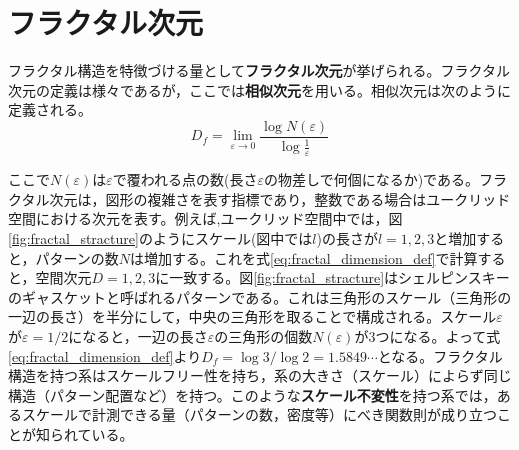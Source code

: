 \documentclass[autodetect-engine,dvi=dvipdfmx,a4paper,ja=standard,oneside,openany,11pt,draft]{bxjsbook}
\begin{document}
\section{フラクタル次元}
\label{sec:fractal_dimension}
フラクタル構造を特徴づける量として\textbf{フラクタル次元}が挙げられる。フラクタル次元の定義は様々であるが，ここでは\textbf{相似次元}を用いる。相似次元は次のように定義される。
\begin{equation}
  D_f=\lim_{\varepsilon \to 0}\frac{\log N(\varepsilon)}{\log \frac{1}{\varepsilon}}
  \label{eq:fractal_dimension_def}
\end{equation}

ここで$N(\varepsilon)$は$\varepsilon$で覆われる点の数(長さ$\varepsilon$の物差しで何個になるか)である。フラクタル次元は，図形の複雑さを表す指標であり，整数である場合はユークリッド空間における次元を表す。例えば,ユークリッド空間中では，図\ref{fig:fractal_stracture}のようにスケール(図中では$l$)の長さが$l=1,2,3$と増加すると，パターンの数$N$は増加する。これを式\ref{eq:fractal_dimension_def}で計算すると，空間次元$D=1,2,3$に一致する。図\ref{fig:fractal_stracture}はシェルピンスキーのギャスケットと呼ばれるパターンである。これは三角形のスケール（三角形の一辺の長さ）を半分にして，中央の三角形を取ることで構成される。スケール$\varepsilon$が$\varepsilon=1/2$になると，一辺の長さ$\varepsilon$の三角形の個数$N(\varepsilon)$が3つになる。よって式\ref{eq:fractal_dimension_def}より$D_f=\log 3/\log 2=1.5849\cdots$となる。フラクタル構造を持つ系はスケールフリー性を持ち，系の大きさ（スケール）によらず同じ構造（パターン配置など）を持つ。このような\textbf{スケール不変性}を持つ系では，あるスケールで計測できる量（パターンの数，密度等）にべき関数則が成り立つことが知られている。
\end{document}
